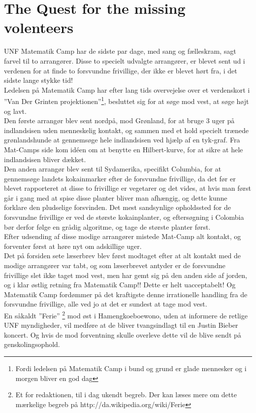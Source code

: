 \begin{minipage}[t]{185mm}
\vspace{3mm}
\section*{The Quest for the missing volenteers}
UNF Matematik Camp har de sidste par dage, med sang og fælleskram, sagt farvel til to arrangører. Disse to specielt udvalgte arrangører, er blevet sent ud i verdenen for at finde to forsvundne frivillige, der ikke er blevet hørt fra, i det sidste lange stykke tid! \\ 
Ledelsen på Matematik Camp har efter lang tids overvejelse over et verdenskort i ”Van Der Grinten projektionen”\footnote{Fordi ledelsen på Matematik Camp i bund og grund er glade mennesker og i morgen bliver en god dag}, besluttet sig for at søge mod vest, at søge højt og lavt. \\
Den første arrangør blev sent nordpå, mod Grønland, for at bruge 3 uger på indlandsisen uden menneskelig kontakt, og sammen med et hold specielt trænede grønlandshunde at gennemsøge hele indlandsisen ved hjælp af en tyk-graf. Fra Mat-Camps side kom idéen om at benytte en Hilbert-kurve, for at sikre at hele indlandsisen bliver dækket. \\
Den anden arrangør blev sent til Sydamerika, specifikt Columbia, for at gennemsøge landets kokainmarker efter de forsvundne frivillige, da det før er blevet rapporteret at disse to frivillige er vegetarer og det vides, at hvis man først går i gang med at spise disse planter bliver man afhængig, og dette kunne forklare den pludselige forsvinden.  Det mest sandsynlige opholdssted for de forsvundne frivillige er ved de største kokainplanter, og eftersøgning i Colombia bør derfor følge en grådig algoritme, og tage de største planter først. \\
Efter udsending af disse modige arrangører mistede Mat-Camp alt kontakt, og forventer først at høre nyt om adskillige uger. \\
Det på forsiden sete læserbrev blev først modtaget efter at alt kontakt med de modige arrangører var tabt, og som læserbrevet antyder er de forsvundne frivillige slet ikke taget mod vest, men har gemt sig på den anden side af jorden, og i klar østlig retning fra Matematik Camp!! Dette er helt uacceptabelt! Og Matematik Camp fordømmer på det kraftigste denne irrationelle handling fra de forsvundne frivillige, alle ved jo at det er sundest at tage mod vest. \\
En såkaldt ”Ferie” \footnote{Et for redaktionen, til i dag ukendt begreb. Der kan læses mere om dette mærkelige begreb på http://da.wikipedia.org/wiki/Ferie} mod øst i Hamengkoeboewono, uden at informere de retlige UNF myndigheder, vil medføre at de bliver tvangsindlagt til en Justin Bieber koncert. Og hvis de mod forventning skulle overleve dette vil de blive sendt på genskolingsophold.


\end{minipage}
